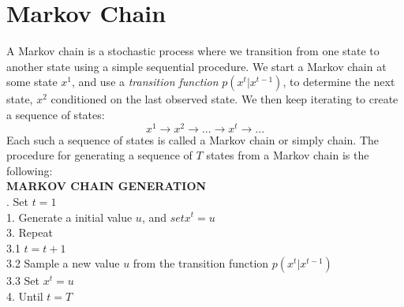 \section{Markov Chain}
A Markov chain is a stochastic process where we transition from one state to another state
using a simple sequential procedure. We start a Markov chain at some state $x^1$, and use
a \textit{transition function} $p(x^t|x^{t-1})$, to determine the next state, $x^2$ conditioned on the last observed state. 
We then keep iterating to create a sequence of states:
$$
x^1  \rightarrow  x^2  \rightarrow . . . → x^t  \rightarrow . . .
$$
Each such a sequence of states is called a Markov chain or simply chain. The procedure
for generating a sequence of $T$ states from a Markov chain is the following:\\
{\bf MARKOV CHAIN GENERATION}\\[.4cm]
{. \hspace*{0.2cm} Set $t=1$  \\
1. \hspace*{0.2cm} Generate a initial value $u$, and $set x^t = u$\\
3. \hspace*{0.2cm}  Repeat\\
3.1 \hspace*{0.3cm} $t=t+1$\\
3.2 \hspace*{0.3cm} Sample a new value $u$ from the transition function $p( x^t |x^{t-1})$\\
3.3 \hspace*{0.3cm} Set $x^t = u$\\
4. Until $t = T$\\
}\\[.4cm]
\\
\\


